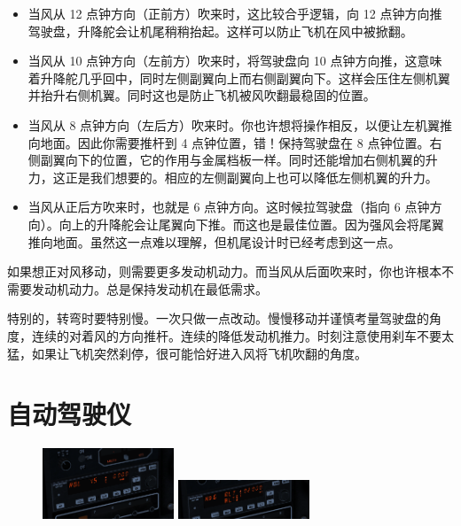 \begin{itemize}
\begin{itemize}
    \item 当风从 12 点钟方向（正前方）吹来时，这比较合乎逻辑，向 12 点钟方向推驾驶盘，升降舵会让机尾稍稍抬起。这样可以防止飞机在风中被掀翻。
    \item 当风从 10 点钟方向（左前方）吹来时，将驾驶盘向 10 点钟方向推，这意味着升降舵几乎回中，同时左侧副翼向上而右侧副翼向下。这样会压住左侧机翼并抬升右侧机翼。同时这也是防止飞机被风吹翻最稳固的位置。
    \item 当风从 8 点钟方向（左后方）吹来时。你也许想将操作相反，以便让左机翼推向地面。因此你需要推杆到 4 点钟位置，错！保持驾驶盘在 8 点钟位置。右侧副翼向下的位置，它的作用与金属档板一样。同时还能增加右侧机翼的升力，这正是我们想要的。相应的左侧副翼向上也可以降低左侧机翼的升力。
    \item 当风从正后方吹来时，也就是 6 点钟方向。这时候拉驾驶盘（指向 6 点钟方向）。向上的升降舵会让尾翼向下推。而这也是最佳位置。因为强风会将尾翼推向地面。虽然这一点难以理解，但机尾设计时已经考虑到这一点。
\end{itemize}

如果想正对风移动，则需要更多发动机动力。而当风从后面吹来时，你也许根本不需要发动机动力。总是保持发动机在最低需求。

特别的，转弯时要特别慢。一次只做一点改动。慢慢移动并谨慎考量驾驶盘的角度，连续的对着风的方向推杆。连续的降低发动机推力。时刻注意使用刹车不要太猛，如果让飞机突然刹停，很可能恰好进入风将飞机吹翻的角度。

\section{自动驾驶仪}
\label{sec:Autopilot}

\begin{figure}
  \includegraphics[width=0.35\textwidth]{img/basic_tutorial/autopilot}
  \includegraphics[width=0.35\textwidth]{img/basic_tutorial/autopilot-2}
\end{figure}


\end{itemize}
